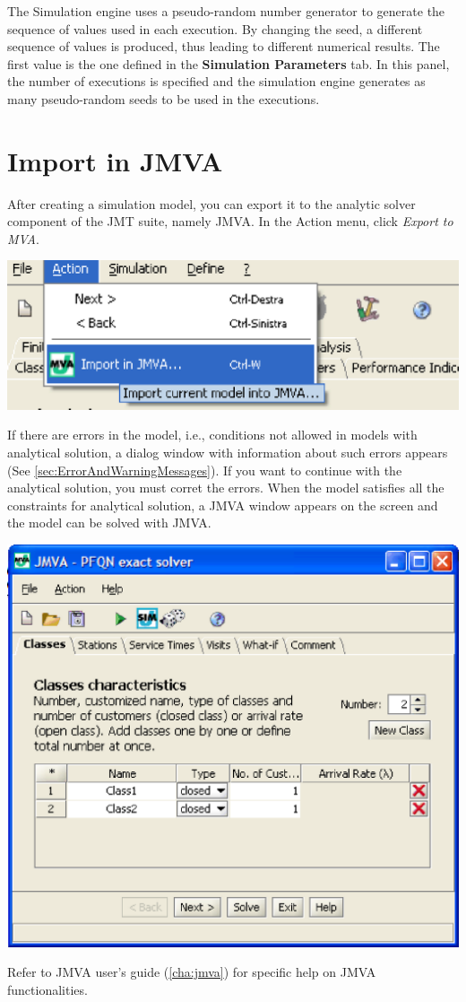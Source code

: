 The Simulation engine uses a pseudo-random number generator to generate the sequence of values used in each execution. By changing the seed, a different sequence of values is produced, thus leading to different numerical results. The first value is the one defined in the \textbf{Simulation Parameters} tab. In this panel, the number of executions is specified and the simulation engine generates as many pseudo-random seeds to be used in the executions.

\section{Import in JMVA}
\label{sec:importInJMVA}
After creating a simulation model, you can export it to the analytic solver component of the JMT suite, namely JMVA. In the Action menu, click \emph{Export to MVA}.
\begin{center}
\includegraphics[scale=.5]{img/jsim/import_to_JMVA.eps}
\end{center}
If there are errors in the model, i.e., conditions not allowed in models with analytical solution, a dialog window with information about such errors appears (See \autoref{sec:ErrorAndWarningMessages}). If you want to continue with the analytical solution, you must corret the errors.
When the model satisfies all the constraints for analytical solution, a JMVA window appears on the screen and the model can be solved with JMVA.
\begin{center}
\includegraphics[scale=.5]{img/jsim/jmva.eps}
\end{center}
Refer to JMVA user's guide (\autoref{cha:jmva}) for specific help on JMVA functionalities.

